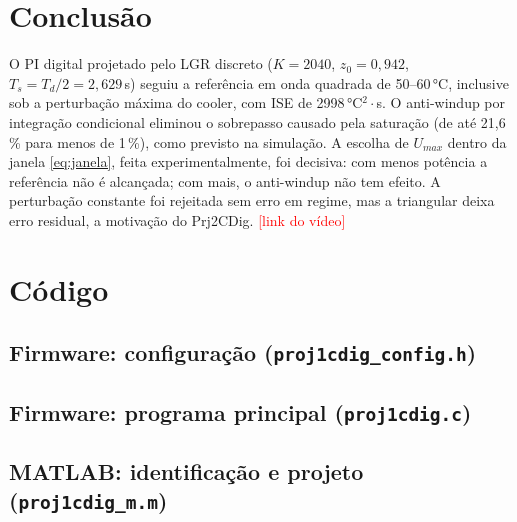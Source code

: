 \documentclass[a4paper]{ifacconf}
\newcommand{\pendente}[1]{\textcolor{red}{[#1]}}
\begin{document}
\section{Conclusão}

O PI digital projetado pelo LGR discreto ($K=2040$, $z_0=0{,}942$, $T_s=T_d/2=2{,}629$\,s) seguiu a
referência em onda quadrada de 50--60\,°C, inclusive sob a perturbação máxima do cooler, com ISE de
2998\,°C$^2\cdot$s. O anti-windup por integração condicional eliminou o sobrepasso causado pela
saturação (de até 21,6\,\% para menos de 1\,\%), como previsto na simulação. A escolha de $U_{max}$
dentro da janela \eqref{eq:janela}, feita experimentalmente, foi decisiva: com menos potência a
referência não é alcançada; com mais, o anti-windup não tem efeito. A perturbação constante foi
rejeitada sem erro em regime, mas a triangular deixa erro residual, a motivação do Prj2CDig.
\pendente{link do vídeo}



\onecolumn
\appendix
\section{Código}\label{ap:codigo}

\subsection{Firmware: configuração (\texttt{proj1cdig\_config.h})}


\subsection{Firmware: programa principal (\texttt{proj1cdig.c})}


\subsection{MATLAB: identificação e projeto (\texttt{proj1cdig\_m.m})}

\end{document}
